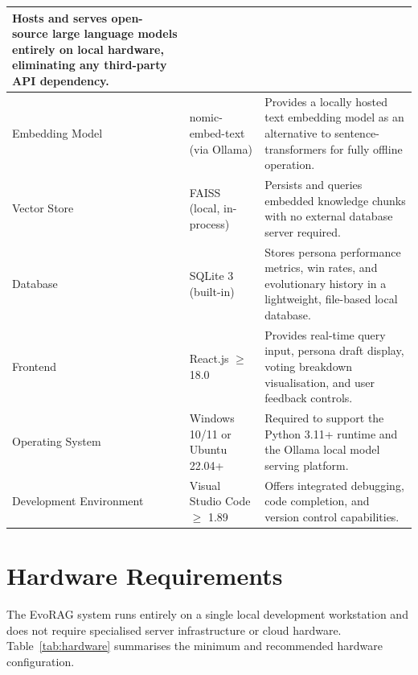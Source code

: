 \begin{center}
\begin{longtable}{|p{3.8cm}|p{3.5cm}|p{6.2cm}|}
Hosts and serves open-source large language models entirely on local
hardware, eliminating any third-party API dependency. \\
\hline
Embedding Model & nomic-embed-text (via Ollama) &
Provides a locally hosted text embedding model as an alternative to
sentence-transformers for fully offline operation. \\
\hline
Vector Store & FAISS (local, in-process) &
Persists and queries embedded knowledge chunks with no external
database server required. \\
\hline
Database & SQLite 3 (built-in) &
Stores persona performance metrics, win rates, and evolutionary
history in a lightweight, file-based local database. \\
\hline
Frontend & React.js $\geq$ 18.0 &
Provides real-time query input, persona draft display, voting breakdown
visualisation, and user feedback controls. \\
\hline
Operating System & Windows 10/11 or Ubuntu 22.04+ &
Required to support the Python 3.11+ runtime and the Ollama local
model serving platform. \\
\hline
Development Environment & Visual Studio Code $\geq$ 1.89 &
Offers integrated debugging, code completion, and version control
capabilities. \\
\hline
\end{longtable}
\end{center}

\clearpage



\section{Hardware Requirements}

The EvoRAG system runs entirely on a single local development workstation and does
not require specialised server infrastructure or cloud hardware.
Table~\ref{tab:hardware} summarises the minimum and recommended hardware configuration.

\vspace{0.5em}

